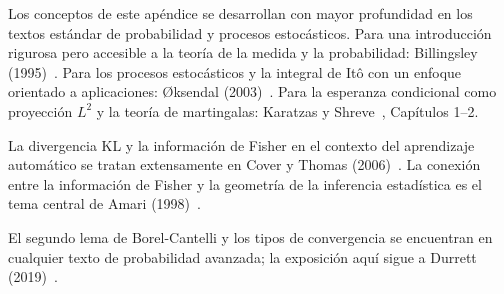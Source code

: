 \begin{notasbib}
Los conceptos de este apéndice se desarrollan con mayor profundidad en los
textos estándar de probabilidad y procesos estocásticos. Para una introducción
rigurosa pero accesible a la teoría de la medida y la probabilidad: Billingsley
(1995)~\cite{billingsley1999convergence}. Para los procesos estocásticos y la
integral de Itô con un enfoque orientado a aplicaciones: Øksendal
(2003)~\cite{oksendal2003stochastic}. Para la esperanza condicional como
proyección $L^2$ y la teoría de martingalas: Karatzas y
Shreve~\cite{karatzas1991brownian}, Capítulos 1--2.

La divergencia KL y la información de Fisher en el contexto del aprendizaje
automático se tratan extensamente en Cover y Thomas
(2006)~\cite{cover2006elements}. La conexión entre la información de Fisher
y la geometría de la inferencia estadística es el tema central de Amari
(1998)~\cite{amari1998natural}.

El segundo lema de Borel-Cantelli y los tipos de convergencia se encuentran
en cualquier texto de probabilidad avanzada; la exposición aquí sigue a
Durrett (2019)~\cite{durrett2019probability}.
\end{notasbib}

\printbibliography[heading=subbibliography]